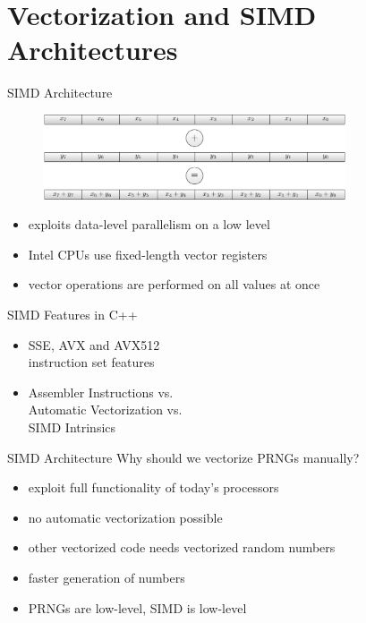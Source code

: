 \documentclass[aspectratio=169]{beamer}
\newcommand{\inputCodeBlock}[1]{%
    \begin{center}
        
    \end{center}
}
\begin{document}
  \section{Vectorization and SIMD Architectures} %
    \begin{frame}{SIMD Architecture}
      \begin{figure}
        \includegraphics[width=0.8\textwidth]{figures/simd_vector_operations.pdf}
      \end{figure}
      \begin{itemize}
        \pause
        \item exploits data-level parallelism on a low level
        \pause
        \item Intel CPUs use fixed-length vector registers
        \pause
        \item vector operations are performed on all values at once
      \end{itemize}
    \end{frame}

    \begin{frame}{SIMD Features in C++}
      \begin{minipage}[c]{0.49\textwidth}
        \begin{itemize}
          \pause
          \item SSE, AVX and AVX512 \\ instruction set features
          \pause
          \item Assembler Instructions vs. \\ Automatic Vectorization vs. \\ SIMD Intrinsics
        \end{itemize}
      \end{minipage}
      \hfill
      \pause
      \begin{minipage}{0.49\textwidth}
        \inputCodeBlock{code/intel_simd.cpp}
      \end{minipage}
    \end{frame}

    \begin{frame}{SIMD Architecture}
      Why should we vectorize PRNGs manually?
      \begin{itemize}
        \pause
        \item exploit full functionality of today's processors
        \pause
        \item no automatic vectorization possible
        \pause
        \item other vectorized code needs vectorized random numbers
        \pause
        \item faster generation of numbers
        \pause
        \item PRNGs are low-level, SIMD is low-level
      \end{itemize}
    \end{frame}
\end{document}
